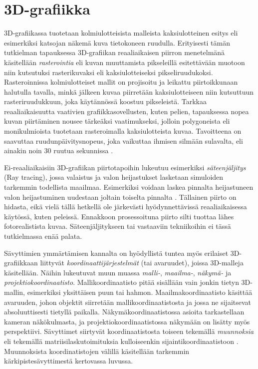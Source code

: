 \documentclass[finnish]{tktltiki2}
\theoremstyle{definition}
\theoremstyle{remark}
\begin{document}
\section{3D-grafiikka}

3D-grafiikassa tuotetaan kolmiulotteisista malleista kaksiulotteinen esitys eli esimerkiksi katsojan näkemä kuva tietokoneen ruudulla. Erityisesti tämän tutkielman tapauksessa 3D-grafiikan reaaliaikaisen piirron menetelmänä käsitellään \emph{rasterointia} eli kuvan muuttamista pikseleillä esitettävään muotoon niin kutsutuksi rasterikuvaksi eli kaksiulotteiseksi pikseliruudukoksi. Rasteroinnissa kolmiulotteiset mallit on projisoitu ja leikattu piirtoikkunaan halutulla tavalla, minkä jälkeen kuvaa piirretään kaksiulotteiseen niin kutsuttuun rasteriruudukkuun, joka käytännössä koostuu pikseleistä. Tarkkaa reaaliaikaisuutta vaativien grafiikkasovellusten, kuten pelien, tapauksessa nopea kuvan piirtäminen nousee tärkeäksi vaatimukseksi, jolloin polygoneista eli monikulmioista tuotetaan rasteroimalla kaksiulotteista kuvaa. Tavoitteena on saavuttaa ruudunpäivitysnopeus, joka vaikuttaa ihmisen silmään sulavalta, eli ainakin noin 30 ruutua sekunnissa \cite[s. 444-445]{Gre14}. 

Ei-reaaliaikaisiin 3D-grafiikan piirtotapoihin lukeutuu esimerkiksi \emph{säteenjäljitys} (Ray tracing), jossa valaistus ja valon heijastukset lasketaan simuloiden tarkemmin todellista maailmaa. Esimerkiksi voidaan laskea pinnalta heijastuneen valon heijastuminen uudestaan joltain toiselta pinnalta \cite[s.405-406]{Puh08}. Tällainen piirto on hidasta, eikä vielä tällä hetkellä ole järkevästi hyödynnettävissä reaaliaikaisessa käytössä, kuten peleissä. Ennakkoon prosessoituna piirto silti tuottaa lähes fotorealistista kuvaa. Säteenjäljitykseen tai vastaaviin tekniikoihin ei tässä tutkielmassa enää palata.

Sävyttimien ymmärtämisen kannalta on hyödyllistä tuntea myös erilaiset 3D-grafiikkaan liittyvät \emph{koordinaattijärjestelmät} (tai avaruudet), joissa 3D-malleja käsitellään. Näihin lukeutuvat muun muassa \emph{malli-}, \emph{maailma-}, \emph{näkymä-} ja \emph{projektiokoordinaatisto}. Mallikoordinaatisto pitää sisällään vain jonkin tietyn 3D-mallin, esimerkiksi yksittäisen puun tai hahmon. Maailmakoordinaatisto käsittää avaruuden, johon objektit siirretään mallikoordinaatistosta ja jossa ne sijaitsevat absoluuttisesti tietyllä paikalla. Näkymäkoordinaatistossa asioita tarkastellaan kameran näkökulmasta, ja projektiokoordinaatistossa näkymään on lisätty myös perspektiivi. Sävyttimet siirtyvät koordinaatistosta toiseen tekemällä \emph{muunnoksia} eli tekemällä matriisilaskutoimituksia kulloiseenkin sijaintikoordinaatistoon \cite[s. 167-171]{Puh08}. Muunnoksista koordinatistojen välillä käsitellään tarkemmin kärkipistesävyttimestä kertovassa luvussa.
\end{document}
